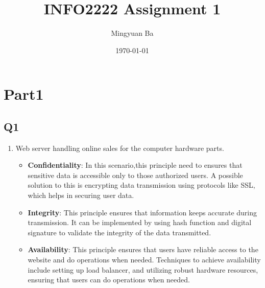 \documentclass{article}
\begin{document}
\title{INFO2222 Assignment 1}
\author{Mingyuan Ba}
\date{\today}
\maketitle


\section{Part1}
\subsection{Q1}
\begin{enumerate}
    \item Web server handling online sales for the computer hardware parts.
        \begin{itemize}
            \item \textbf{Confidentiality}: In this scenario,this principle need to ensures that sensitive data is accessible only to those authorized users\cite{Lecture1}. A possible solution to this is encrypting data transmission using protocols like SSL, which helps in securing user data.
            \item \textbf{Integrity}: This principle ensures that information keeps accurate during transmission\cite{Lecture1}. It can be implemented by using hash function\cite{2-1-1.Hash(1)} and digital signature to validate the integrity of the data transmitted.
            \item \textbf{Availability}: This principle ensures that users have reliable access to the website and do operations when needed\cite{Lecture1}. Techniques to achieve availability include setting up load balancer\cite{AlibabaCloud2019HighAvailability}, and utilizing robust hardware resources, ensuring that users can do operations when needed.
        \end{itemize}


\end{enumerate}
\end{document}
